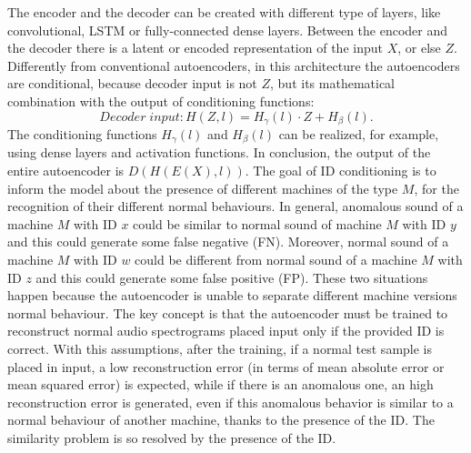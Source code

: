 The encoder and the decoder can be created with different type of layers, like convolutional, LSTM or fully-connected dense layers. Between the encoder and the decoder there is a latent or encoded representation of the input $X$, or else $Z$. Differently from conventional autoencoders, in this architecture the autoencoders are conditional, because decoder input is not $Z$, but its mathematical combination with the output of conditioning functions: \[Decoder \; input: H(Z,l) = H_\gamma(l) \cdot Z + H_\beta(l).\] The conditioning functions $H_\gamma(l)$ and $ H_\beta(l)$ can be realized, for example, using dense layers and activation functions. In conclusion, the output of the entire autoencoder is $D(H(E(X),l))$. The goal of ID conditioning is to inform the model about the presence of different machines of the type $M$, for the recognition of their different normal behaviours. In general, anomalous sound of a machine $M$ with ID $x$ could be similar to normal sound of machine $M$ with ID $y$ and this could generate some false negative (FN). Moreover, normal sound of a machine $M$ with ID $w$ could be different from normal sound of a machine $M$ with ID $z$ and this could generate some false positive (FP). These two situations happen because the autoencoder is unable to separate different machine versions normal behaviour. The key concept is that the autoencoder must be trained to reconstruct normal audio spectrograms placed input only if the provided ID is correct. With this assumptions, after the training, if a normal test sample is placed in input, a low reconstruction error (in terms of mean absolute error or mean squared error) is expected, while if there is an anomalous one, an high reconstruction error is generated, even if this anomalous behavior is similar to a normal behaviour of another machine, thanks to the presence of the ID. The similarity problem is so resolved by the presence of the ID. 
